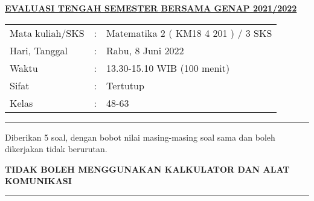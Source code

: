 \documentclass[10pt,openany,a4paper]{article}
\begin{document}
    \begin{center}
	{\underline{\textbf{\MakeUppercase{Evaluasi Tengah Semester Bersama Genap 2021/2022}}}}
    \end{center}

    \begin{center}
	\begin{tabular}{lcl}
		Mata kuliah/SKS & : & Matematika 2 ( KM18 4 201 ) / 3 SKS\\
		Hari, Tanggal & : & Rabu, 8 Juni 2022\\
		Waktu & : & 13.30-15.10 WIB (100 menit)\\
		Sifat & : & Tertutup\\
		Kelas & : & 48-63
	\end{tabular}
    \end{center}
	
    \noindent\rule{\textwidth}{2.pt}
	
    \setlength{\parindent}{5pt}
    \par Diberikan 5 soal, dengan bobot nilai masing-masing soal sama dan boleh dikerjakan tidak berurutan.
    \setlength{\parindent}{5pt}
    \setlength{\parindent}{5pt}
    \par \textbf{\MakeUppercase{Tidak boleh menggunakan kalkulator dan alat komunikasi}}
    \par {}
	
    \noindent\rule{\textwidth}{2.pt}
	
\end{document}
